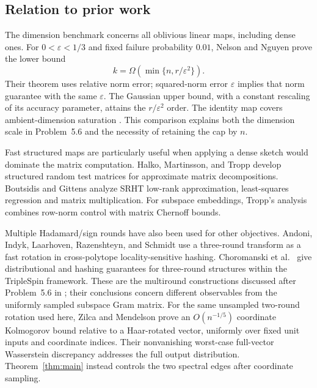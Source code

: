 \documentclass[11pt]{article}
\theoremstyle{definition}
\theoremstyle{remark}
\theoremstyle{plain}
\begin{document}
\subsection*{Relation to prior work}

The dimension benchmark concerns all oblivious linear maps, including
dense ones. For $0<\varepsilon<1/3$ and fixed failure probability
$0.01$, Nelson and Nguyen \cite[Theorem~6]{nelson_nguyen} prove the
lower bound
\[
 k=\Omega\!\left(\min\{n,r/\varepsilon^2\}\right).
\]
Their theorem uses relative norm error; squared-norm error
$\varepsilon$ implies that norm guarantee with the same $\varepsilon$.
The Gaussian upper bound, with a constant rescaling of its accuracy
parameter, attains the $r/\varepsilon^2$ order. The identity map
covers ambient-dimension saturation \cite[Section~1]{nelson_nguyen}.
This comparison explains both the dimension scale in Problem~5.6
and the necessity of retaining the cap by $n$.

Fast structured maps are particularly useful when applying a dense
sketch would dominate the matrix computation. Halko, Martinsson,
and Tropp \cite[Sections~4.6 and~11]{hmt} develop structured random
test matrices for approximate matrix decompositions.
Boutsidis and Gittens \cite[Theorems~2.1 and~3.1, Lemma~4.11]{boutsidis_gittens}
analyze SRHT low-rank approximation, least-squares regression and
matrix multiplication. For subspace embeddings, Tropp's analysis
\cite[Theorem~3.1]{tropp_srht} combines row-norm control with matrix
Chernoff bounds.

Multiple Hadamard/sign rounds have also been used for other objectives.
Andoni, Indyk, Laarhoven, Razenshteyn, and Schmidt
\cite[Section~3.1]{andoni_lsh} use a three-round transform as a fast
rotation in cross-polytope locality-sensitive hashing.
Choromanski et al.\ \cite[Lemma~1 and Theorems~5.1--5.3]{triplespin}
give distributional and hashing guarantees for three-round structures
within the TripleSpin framework. These are the multiround constructions
discussed after Problem~5.6 in \cite{workshop}; their conclusions concern
different observables from the uniformly sampled subspace Gram matrix.
For the same unsampled two-round rotation used here, Zilca and
Mendelson \cite[Equation~(1) and Theorem~4.1]{zilca_mendelson}
prove an $O(n^{-1/5})$ coordinate Kolmogorov bound relative to
a Haar-rotated vector, uniformly over fixed unit inputs and coordinate
indices. Their nonvanishing worst-case full-vector Wasserstein
discrepancy \cite[Theorems~5.1--5.2]{zilca_mendelson} addresses the
full output distribution. Theorem~\ref{thm:main} instead controls
the two spectral edges after coordinate sampling.
\end{document}
